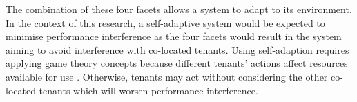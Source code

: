 The combination of these four facets allows a system to adapt to its
environment. In the context of this research, a self-adaptive system
would be expected to minimise performance interference as the four
facets would result in the system aiming to avoid interference with
co-located tenants. Using self-adaption requires applying game theory
concepts because different tenants' actions affect resources
available for use \cite{glazier2017utility}. Otherwise, tenants may act
without considering the other co-located tenants which will worsen performance
interference.
